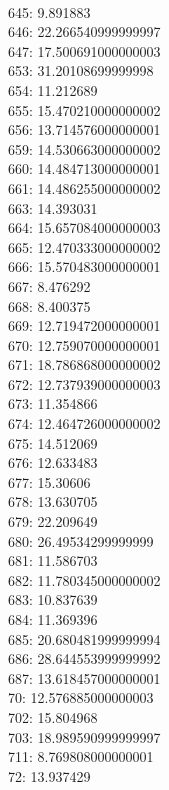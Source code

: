 \begin{multicols}{4}
  \\ 645: 9.891883
  \\ 646: 22.266540999999997
  \\ 647: 17.500691000000003
  \\ 653: 31.20108699999998
  \\ 654: 11.212689
  \\ 655: 15.470210000000002
  \\ 656: 13.714576000000001
  \\ 659: 14.530663000000002
  \\ 660: 14.484713000000001
  \\ 661: 14.486255000000002
  \\ 663: 14.393031
  \\ 664: 15.657084000000003
  \\ 665: 12.470333000000002
  \\ 666: 15.570483000000001
  \\ 667: 8.476292
  \\ 668: 8.400375
  \\ 669: 12.719472000000001
  \\ 670: 12.759070000000001
  \\ 671: 18.786868000000002
  \\ 672: 12.737939000000003
  \\ 673: 11.354866
  \\ 674: 12.464726000000002
  \\ 675: 14.512069
  \\ 676: 12.633483
  \\ 677: 15.30606
  \\ 678: 13.630705
  \\ 679: 22.209649
  \\ 680: 26.49534299999999
  \\ 681: 11.586703
  \\ 682: 11.780345000000002
  \\ 683: 10.837639
  \\ 684: 11.369396
  \\ 685: 20.680481999999994
  \\ 686: 28.644553999999992
  \\ 687: 13.618457000000001
  \\ 70: 12.576885000000003
  \\ 702: 15.804968
  \\ 703: 18.989590999999997
  \\ 711: 8.769808000000001
  \\ 72: 13.937429

\end{multicols}
